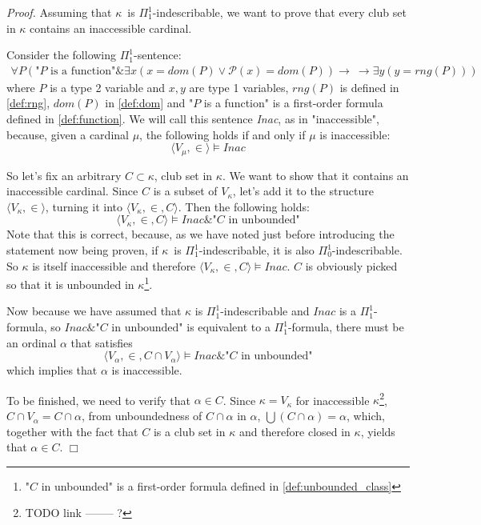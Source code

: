 \documentclass[12pt,a4paper]{article}
\newenvironment{proof}
{\noindent \textit{Proof.}}
{\hspace*{\fill} $\Box$}
\newcommand{\power}[1]{\ensuremath{\mathscr{P}} (#1)}
\newcommand{\then}{\rightarrow}
\newcommand{\et}{\mathrel{\&}}
\begin{document}
\begin{proof}
Assuming that $\kappa$ is $\Pi^1_1$-indescribable, we want to prove that every club set in $\kappa$ contains an inaccessible cardinal. 

Consider the following $\Pi^1_1$-sentence:
\begin{equation}
\begin{gathered}\label{eq:inac}
\forall P (\mbox{"$P$ is a function"} \et \exists x(x = dom(P) \lor \power{x} = dom(P)) \then\
\then \exists y(y = rng(P)))
\end{gathered}
\end{equation}
where $P$ is a type 2 variable and $x, y$ are type 1 variables, $rng(P)$ is defined in \ref{def:rng}, $dom(P)$ in \ref{def:dom} and "$P$ is a function" is a first-order formula defined in \ref{def:function}.
We will call this sentence \emph{Inac}, as in "inaccessible", because, given a cardinal $\mu$, the following holds if and only if $\mu$ is inaccessible:
\begin{equation}
\langle V_\mu, \in \rangle \models Inac
\end{equation}

So let's fix an arbitrary $C \subset \kappa$, club set in $\kappa$. We want to show that it contains an inaccessible cardinal. Since $C$ is a subset of $V_\kappa$, let's add it to the structure $\langle V_\kappa, \in \rangle$, turning it into $\langle V_\kappa, \in, C \rangle$. Then the following holds:
\begin{equation}
\langle V_\kappa, \in, C \rangle \models Inac \et \mbox{"$C$ in unbounded"}
\end{equation}
Note that this is correct, because, as we have noted just before introducing the statement now being proven, if $\kappa$ is $\Pi^1_1$-indescribable, it is also $\Pi^1_0$-indescribable. So $\kappa$ is itself inaccessible and therefore $\langle V_\kappa, \in, C \rangle \models Inac$. $C$ is obviously picked so that it is unbounded in $\kappa$\footnote{"$C$ in unbounded" is a first-order formula defined in \ref{def:unbounded_class}}.

Now because we have assumed that $\kappa$ is $\Pi^1_1$-indescribable and $Inac$ is a $\Pi^1_1$-formula, so $Inac \et \mbox{"$C$ in unbounded"}$ is equivalent to a $\Pi^1_1$-formula, there must be an ordinal $\alpha$ that satisfies
\begin{equation}
\langle V_\alpha, \in, C \cap V_\alpha \rangle \models Inac \et \mbox{"$C$ in unbounded"}
\end{equation}
which implies that $\alpha$ is inaccessible. 

To be finished, we need to verify that $\alpha \in C$. Since $\kappa = V_\kappa$ for inaccessible $\kappa$\footnote{TODO link -------- ?}, $C \cap V_\alpha = C \cap \alpha$, from unboundedness of $C \cap \alpha$ in $\alpha$, $\bigcup(C \cap \alpha) = \alpha$, which, together with the fact that $C$ is a club set in $\kappa$ and therefore closed in $\kappa$, yields that $\alpha \in C$.
\end{proof}
\end{document}
